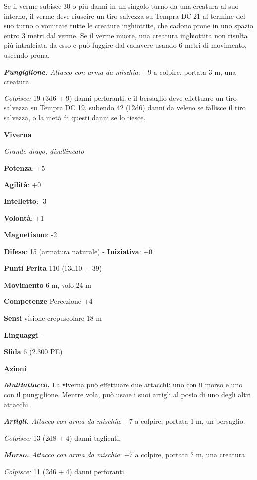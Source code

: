 \begin{multicols}{2}
Se il verme subisce 30 o più danni in un singolo turno da una creatura
al suo interno, il verme deve riuscire un tiro salvezza su Tempra
DC 21 al termine del suo turno o vomitare tutte le creature inghiottite,
che cadono prone in uno spazio entro 3 metri dal verme. Se il verme
muore, una creatura inghiottita non risulta più intralciata da esso e
può fuggire dal cadavere usando 6 metri di movimento, uscendo prona.

\emph{\textbf{Pungiglione.} Attacco con arma da mischia}: +9 a colpire,
portata 3 m, una creatura.

\emph{Colpisce:} 19 (3d6 + 9) danni perforanti, e il bersaglio deve
effettuare un tiro salvezza su Tempra DC 19, subendo 42 (12d6)
danni da veleno se fallisce il tiro salvezza, o la metà di questi danni
se lo riesce.

\textbf{Viverna}

\emph{Grande drago, disallineato}

\textbf{Potenza}: +5

\textbf{Agilità}: +0

\textbf{Intelletto}: -3

\textbf{Volontà}: +1

\textbf{Magnetismo}: -2

\textbf{Difesa}: 15 (armatura naturale) - \textbf{Iniziativa}: +0

\textbf{Punti Ferita} 110 (13d10 + 39)

\textbf{Movimento} 6 m, volo 24 m

\textbf{Competenze} Percezione +4

\textbf{Sensi} visione crepuscolare 18 m

\textbf{Linguaggi} -

\textbf{Sfida} 6 (2.300 PE)\smallskip

\smallskip\textbf{Azioni}

\emph{\textbf{Multiattacco.}} La viverna può effettuare due attacchi:
uno con il morso e uno con il pungiglione. Mentre vola, può usare i suoi
artigli al posto di uno degli altri attacchi.

\emph{\textbf{Artigli.} Attacco con arma da mischia}: +7 a colpire,
portata 1 m, un bersaglio.

\emph{Colpisce:} 13 (2d8 + 4) danni taglienti.

\emph{\textbf{Morso.} Attacco con arma da mischia}: +7 a colpire,
portata 3 m, una creatura.

\emph{Colpisce:} 11 (2d6 + 4) danni perforanti.


\end{multicols}
